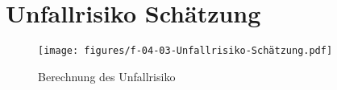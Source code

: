 




%

%

%

\newpage
\printbibliography[heading=bibintoc, title=Literaturverzeichnis]



\appendix
{}
\label{chap:Anhang}

\section{Unfallrisiko Schätzung}
\label{subsec:UnfallrisikoSchätzung}
\begin{figure}[h!]
	\centering
	\texttt{[image: figures/f-04-03-Unfallrisiko-Schätzung.pdf]}
	\caption[Unfallrisiko Schätzung]{Berechnung des Unfallrisiko}
	\label{img:Unfallrisiko}
\end{figure}

\printindex



